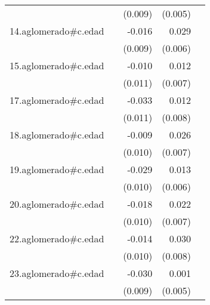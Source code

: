 {\begin{longtable}{l*{4}{D{.}{.}{-1}}}
            &                     &     (0.009)         &     (0.005)         &                     \\
\addlinespace
14.aglomerado#c.edad&                     &      -0.016         &       0.029\sym{***}&                     \\
            &                     &     (0.009)         &     (0.006)         &                     \\
\addlinespace
15.aglomerado#c.edad&                     &      -0.010         &       0.012         &                     \\
            &                     &     (0.011)         &     (0.007)         &                     \\
\addlinespace
17.aglomerado#c.edad&                     &      -0.033\sym{**} &       0.012         &                     \\
            &                     &     (0.011)         &     (0.008)         &                     \\
\addlinespace
18.aglomerado#c.edad&                     &      -0.009         &       0.026\sym{***}&                     \\
            &                     &     (0.010)         &     (0.007)         &                     \\
\addlinespace
19.aglomerado#c.edad&                     &      -0.029\sym{**} &       0.013\sym{*}  &                     \\
            &                     &     (0.010)         &     (0.006)         &                     \\
\addlinespace
20.aglomerado#c.edad&                     &      -0.018         &       0.022\sym{**} &                     \\
            &                     &     (0.010)         &     (0.007)         &                     \\
\addlinespace
22.aglomerado#c.edad&                     &      -0.014         &       0.030\sym{***}&                     \\
            &                     &     (0.010)         &     (0.008)         &                     \\
\addlinespace
23.aglomerado#c.edad&                     &      -0.030\sym{**} &       0.001         &                     \\
            &                     &     (0.009)         &     (0.005)         &                     \\

\end{longtable}}

